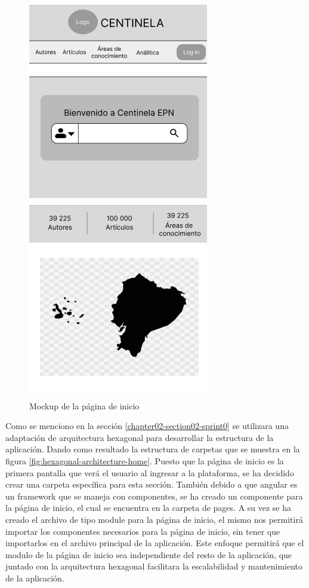 \begin{figure}[H]
    \centering
    \includegraphics[scale=0.9]{../02Figures/02Chapter/Sprints/Sprint-1/mobile-first-home.png}
    \caption{Mockup de la página de inicio}
    \label{fig:mockup-home}
\end{figure}

Como se menciono en la sección \ref{chapter02-section02-sprint0} se utilizara una adaptación de arquitectura hexagonal para desarrollar la estructura de la aplicación.
Dando como resultado la estructura de carpetas que se muestra en la figura \ref{fig:hexagonal-architecture-home}.
Puesto que la página de inicio es la primera pantalla que verá el usuario al ingresar a la plataforma, se ha decidido crear una carpeta específica para esta sección.
También debido a que angular es un framework que se maneja con componentes, se ha creado un componente para la página de inicio, el cual se encuentra en la carpeta de pages.
A su vez  se ha creado el archivo de tipo module para la página de inicio, el mismo nos permitirá importar los componentes necesarios para la página de inicio, sin tener que importarlos en el archivo principal de la aplicación.
Este enfoque permitirá que el modulo de la página de inicio sea independiente del resto de la aplicación, que juntado con la arquitectura hexagonal facilitara la escalabilidad y mantenimiento de la aplicación.

